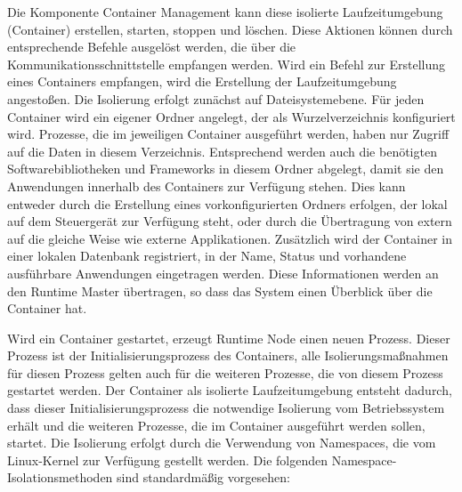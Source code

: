 Die Komponente Container Management kann diese isolierte Laufzeitumgebung (Container) erstellen, starten, stoppen und löschen. Diese Aktionen können durch entsprechende Befehle ausgelöst werden, die über die Kommunikationsschnittstelle empfangen werden. Wird ein Befehl zur Erstellung eines Containers empfangen, wird die Erstellung der Laufzeitumgebung angestoßen. Die Isolierung erfolgt zunächst auf Dateisystemebene. Für jeden Container wird ein eigener Ordner angelegt, der als Wurzelverzeichnis konfiguriert wird. Prozesse, die im jeweiligen Container ausgeführt werden, haben nur Zugriff auf die Daten in diesem Verzeichnis. Entsprechend werden auch die benötigten Softwarebibliotheken und Frameworks in diesem Ordner abgelegt, damit sie den Anwendungen innerhalb des Containers zur Verfügung stehen. Dies kann entweder durch die Erstellung eines vorkonfigurierten Ordners erfolgen, der lokal auf dem Steuergerät zur Verfügung steht, oder durch die Übertragung von extern auf die gleiche Weise wie externe Applikationen. Zusätzlich wird der Container in einer lokalen Datenbank registriert, in der Name, Status und vorhandene ausführbare Anwendungen eingetragen werden. Diese Informationen werden an den Runtime Master übertragen, so dass das System einen Überblick über die Container hat.

Wird ein Container gestartet, erzeugt Runtime Node einen neuen Prozess. Dieser Prozess ist der Initialisierungsprozess des Containers, alle Isolierungsmaßnahmen für diesen Prozess gelten auch für die weiteren Prozesse, die von diesem Prozess gestartet werden. Der Container als isolierte Laufzeitumgebung entsteht dadurch, dass dieser Initialisierungsprozess die notwendige Isolierung vom Betriebssystem erhält und die weiteren Prozesse, die im Container ausgeführt werden sollen, startet. Die Isolierung erfolgt durch die Verwendung von Namespaces, die vom Linux-Kernel zur Verfügung gestellt werden. Die folgenden Namespace-Isolationsmethoden sind standardmäßig vorgesehen:

